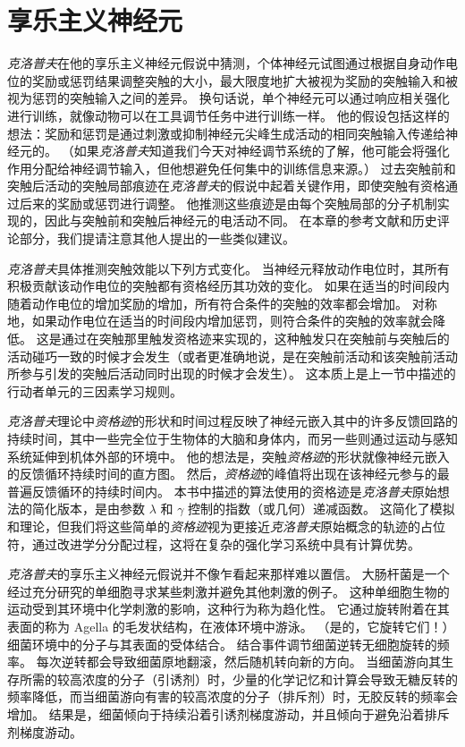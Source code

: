 \section{享乐主义神经元} \label{sec:hedonistic_neurons}


\textit{克洛普夫}\cite{klopf1972brain,klopf1982hedonistic}在他的享乐主义神经元假说中猜测，个体神经元试图通过根据自身动作电位的奖励或惩罚结果调整突触的大小，最大限度地扩大被视为奖励的突触输入和被视为惩罚的突触输入之间的差异。
换句话说，单个神经元可以通过响应相关强化进行训练，就像动物可以在工具调节任务中进行训练一样。
他的假设包括这样的想法：奖励和惩罚是通过刺激或抑制神经元尖峰生成活动的相同突触输入传递给神经元的。
（如果\textit{克洛普夫}知道我们今天对神经调节系统的了解，他可能会将强化作用分配给神经调节输入，但他想避免任何集中的训练信息来源。）
过去突触前和突触后活动的突触局部痕迹在\textit{克洛普夫}的假说中起着关键作用，即使突触有资格通过后来的奖励或惩罚进行调整。
他推测这些痕迹是由每个突触局部的分子机制实现的，因此与突触前和突触后神经元的电活动不同。
在本章的参考文献和历史评论部分，我们提请注意其他人提出的一些类似建议。


\textit{克洛普夫}具体推测突触效能以下列方式变化。
当神经元释放动作电位时，其所有积极贡献该动作电位的突触都有资格经历其功效的变化。
如果在适当的时间段内随着动作电位的增加奖励的增加，所有符合条件的突触的效率都会增加。
对称地，如果动作电位在适当的时间段内增加惩罚，则符合条件的突触的效率就会降低。
这是通过在突触那里触发资格迹来实现的，这种触发只在突触前与突触后的活动碰巧一致的时候才会发生（或者更准确地说，是在突触前活动和该突触前活动所参与引发的突触后活动同时出现的时候才会发生）。
这本质上是上一节中描述的行动者单元的三因素学习规则。


\textit{克洛普夫}理论中\textit{资格迹}的形状和时间过程反映了神经元嵌入其中的许多反馈回路的持续时间，其中一些完全位于生物体的大脑和身体内，而另一些则通过运动与感知系统延伸到机体外部的环境中。
他的想法是，突触\textit{资格迹}的形状就像神经元嵌入的反馈循环持续时间的直方图。
然后，\textit{资格迹}的峰值将出现在该神经元参与的最普遍反馈循环的持续时间内。
本书中描述的算法使用的资格迹是\textit{克洛普夫}原始想法的简化版本，是由参数 $\lambda$ 和 $\gamma$ 控制的指数（或几何）递减函数。
这简化了模拟和理论，但我们将这些简单的\textit{资格迹}视为更接近\textit{克洛普夫}原始概念的轨迹的占位符，通过改进学分分配过程，这将在复杂的强化学习系统中具有计算优势。


\textit{克洛普夫}的享乐主义神经元假说并不像乍看起来那样难以置信。
大肠杆菌是一个经过充分研究的单细胞寻求某些刺激并避免其他刺激的例子。
这种单细胞生物的运动受到其环境中化学刺激的影响，这种行为称为趋化性。
它通过旋转附着在其表面的称为 Agella 的毛发状结构，在液体环境中游泳。 （是的，它旋转它们！）细菌环境中的分子与其表面的受体结合。
结合事件调节细菌逆转无细胞旋转的频率。
每次逆转都会导致细菌原地翻滚，然后随机转向新的方向。
当细菌游向其生存所需的较高浓度的分子（引诱剂）时，少量的化学记忆和计算会导致无糖反转的频率降低，而当细菌游向有害的较高浓度的分子（排斥剂）时，无胶反转的频率会增加。
结果是，细菌倾向于持续沿着引诱剂梯度游动，并且倾向于避免沿着排斥剂梯度游动。


